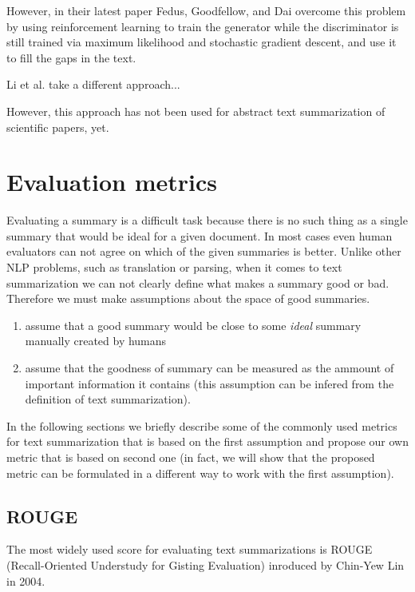 \documentclass[sigplan]{acmart}
\begin{document}
However, in their latest paper Fedus, Goodfellow, and Dai\cite{fedus-18} overcome this problem by using reinforcement learning to train the generator while the discriminator is still trained via maximum likelihood and stochastic gradient descent, and use it to fill the gaps in the text.

Li et al.\cite{li-pan-18} take a different approach...
 
However, this approach has not been used for abstract text summarization of scientific papers, yet.

\section{Evaluation metrics}
\label{sec:evaluation}

Evaluating a summary is a difficult task because there is no such thing as a single summary that would be ideal for a given document. In most cases even human evaluators can not agree on which of the given summaries is better\cite{das-7}. Unlike other NLP problems, such as translation or parsing, when it comes to text summarization we can not clearly define what makes a summary good or bad. Therefore we must make assumptions about the space of good summaries. 

\begin{enumerate}
\item assume that a good summary would be close to some \textit{ideal} summary manually created by humans
\item assume that the goodness of summary can be measured as the ammount of important information it contains (this assumption can be infered from the definition of text summarization).
\end{enumerate}

In the following sections we briefly describe some of the commonly used metrics for text summarization that is based on the first assumption and propose our own metric that is based on second one (in fact, we will show that the proposed metric can be formulated in a different way to work with the first assumption).

\subsection{ROUGE}

The most widely used score for evaluating text summarizations is ROUGE (Recall-Oriented Understudy for Gisting Evaluation) inroduced by Chin-Yew Lin in 2004\cite{lin-4}\cite{kishore-2}.
\end{document}
